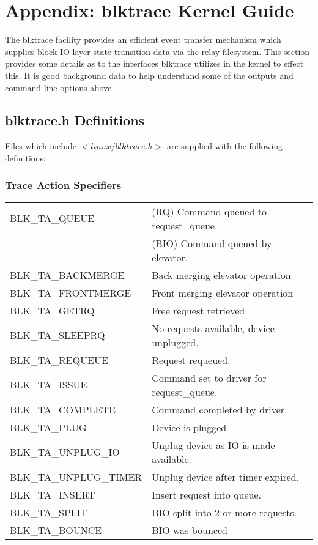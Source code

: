 \documentclass{article}
\begin{document}
\newpage
\newpage\section*{\label{sec:blktrace-kg}Appendix: blktrace Kernel Guide}

The blktrace facility provides an efficient event transfer mechanism which
supplies block IO layer state transition data via the relay
filesystem. This section provides some details as to the interfaces
blktrace utilizes in the kernel to effect this. It is good background data
to help understand some of the outputs and command-line options above.

\subsection{blktrace.h Definitions}
Files which include $<linux/blktrace.h>$ are supplied with the following
definitions:

\subsubsection{Trace Action Specifiers}
\begin{tabular}{|l|l|}\hline
  BLK\_TA\_QUEUE & (RQ) Command queued to request\_queue. \\
                 & (BIO) Command queued by elevator. \\ \hline
  BLK\_TA\_BACKMERGE & Back merging elevator operation \\ \hline
  BLK\_TA\_FRONTMERGE & Front merging elevator operation \\ \hline
  BLK\_TA\_GETRQ & Free request retrieved. \\ \hline
  BLK\_TA\_SLEEPRQ & No requests available, device unplugged. \\ \hline
  BLK\_TA\_REQUEUE & Request requeued. \\ \hline
  BLK\_TA\_ISSUE & Command set to driver for request\_queue. \\ \hline
  BLK\_TA\_COMPLETE & Command completed by driver. \\ \hline
  BLK\_TA\_PLUG & Device is plugged \\ \hline
  BLK\_TA\_UNPLUG\_IO & Unplug device as IO is made available. \\ \hline
  BLK\_TA\_UNPLUG\_TIMER & Unplug device after timer expired. \\ \hline
  BLK\_TA\_INSERT & Insert request into queue. \\ \hline
  BLK\_TA\_SPLIT & BIO split into 2 or more requests. \\ \hline
  BLK\_TA\_BOUNCE & BIO was bounced \\ \hline
\end{tabular}
\end{document}
